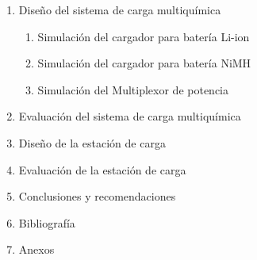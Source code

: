 \begin{enumerate}
\begin{enumerate}
    \end{enumerate}
    \item Diseño del sistema de carga multiquímica
    \begin{enumerate}
        \item Simulación del cargador para batería Li-ion
        \item Simulación del cargador para batería NiMH
        \item Simulación del Multiplexor de potencia
    \end{enumerate}
    \item Evaluación del sistema de carga multiquímica
    \item Diseño de la estación de carga
    \item Evaluación de la estación de carga
    \item Conclusiones y recomendaciones
    \item Bibliografía
    \item Anexos
\end{enumerate}